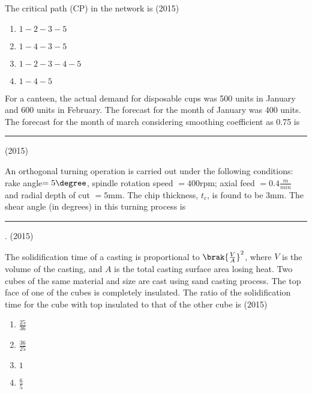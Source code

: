     \begin{table}[h]
        \centering
        
        \label{tab:43}
    \end{table}

    The critical path (CP) in the network is
    \hfill{(2015)}
    
	\begin{multicols}{4}
		\begin{enumerate}
                \item $1-2-3-5$
                \item $1-4-3-5$
                \item $1-2-3-4-5$
                \item $1-4-5$
			\end{enumerate}
		\end{multicols}

    \item For a canteen, the actual demand for disposable cups was 500 units in January and 600 units in February. The forecast for the month of January was 400 units. The forecast for the month of march considering smoothing coefficient as 0.75 is \rule{1cm}{0.15mm}
    \hfill{(2015)}

    \item An orthogonal turning operation is carried out under the following conditions: rake angle$=5\degree$, spindle rotation speed $=400$rpm; axial feed $=0.4\frac{m}{min}$ and radial depth of cut $=5$mm. The chip thickness, $t_c$, is found to be 3mm. The shear angle (in degrees) in this turning process is \rule{1cm}{0.15mm}. 
    \hfill{(2015)}


    \item The solidification time of a casting is proportional to $\brak{\frac{V}{A}}^2$, where $V$ is the volume of the casting, and $A$ is the total casting surface area losing heat. Two cubes of the same material and size are cast using sand casting process. The top face of one of the cubes is completely insulated. The ratio of the solidification time for the cube with top insulated to that of the other cube is
    \hfill{(2015)}

    \begin{multicols}{4}
        \begin{enumerate}
            \item $\frac{25}{36}$
            \item $\frac{36}{25}$
            \item $1$
            \item $\frac{6}{5}$
        \end{enumerate}
    \end{multicols}


